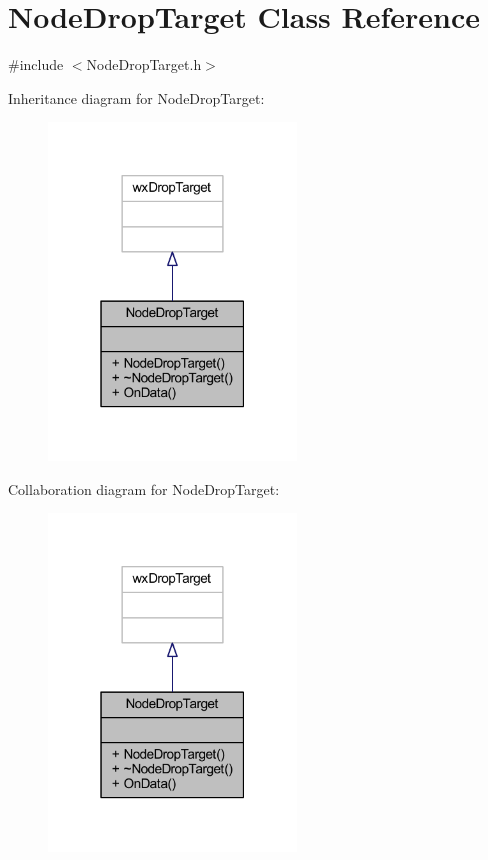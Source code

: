 \hypertarget{class_node_drop_target}{}\section{Node\+Drop\+Target Class Reference}
\label{class_node_drop_target}


{\ttfamily \#include $<$Node\+Drop\+Target.\+h$>$}



Inheritance diagram for Node\+Drop\+Target\+:
\nopagebreak
\begin{figure}[H]
\begin{center}
\leavevmode
\includegraphics[width=187pt]{class_node_drop_target__inherit__graph}
\end{center}
\end{figure}


Collaboration diagram for Node\+Drop\+Target\+:
\nopagebreak
\begin{figure}[H]
\begin{center}
\leavevmode
\includegraphics[width=187pt]{class_node_drop_target__coll__graph}
\end{center}
\end{figure}
